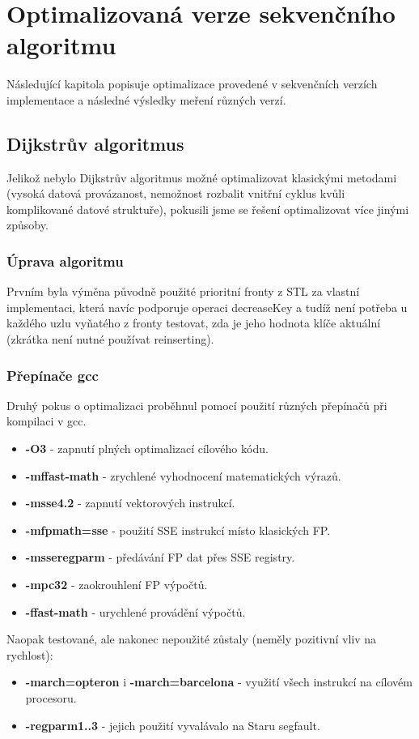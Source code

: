 \documentclass[a4paper,11pt]{article}
\begin{document}
\section{Optimalizovaná verze sekvenčního algoritmu}
Následující kapitola popisuje optimalizace provedené v sekvenčních verzích implementace a následné výsledky meření různých verzí.

\subsection{Dijkstrův algoritmus}
Jelikož nebylo Dijkstrův algoritmus možné optimalizovat klasickými metodami (vysoká datová provázanost, nemožnost rozbalit vnitřní cyklus kvůli komplikované datové struktuře), pokusili jsme se řešení optimalizovat více jinými způsoby. 
\par
\subsubsection{Úprava algoritmu}
Prvním byla výměna původně použité prioritní fronty z STL za vlastní implementaci, která navíc podporuje operaci decreaseKey a tudíž není po\-třeba u každého uzlu vyňatého z fronty testovat, zda je jeho hodnota klíče aktuální (zkrátka není nutné používat reinserting).
\subsubsection{Přepínače gcc}
Druhý pokus o optimalizaci proběhnul pomocí použití různých přepínačů při kompilaci v gcc.
\begin{itemize}
 \item \textbf{-O3} - zapnutí plných optimalizací cílového kódu.
 \item \textbf{-mffast-math} - zrychlené vyhodnocení matematických výrazů.
 \item \textbf{-msse4.2} - zapnutí vektorových instrukcí.
 \item \textbf{-mfpmath=sse} - použití SSE instrukcí místo klasických FP.
 \item \textbf{-msseregparm} - předávání FP dat přes SSE registry.
 \item \textbf{-mpc32} - zaokrouhlení FP výpočtů.
 \item \textbf{-ffast-math} - urychlené provádění výpočtů.
\end{itemize}
 Naopak testované, ale nakonec nepoužité zůstaly (neměly pozitivní vliv na rychlost): 
\begin{itemize}
 \item \textbf{-march=opteron} i \textbf{-march=barcelona}  - využití všech instrukcí na cílovém procesoru.
 \item \textbf{-regparm1..3} - jejich použití vyvalávalo na Staru segfault.
\end{itemize}
\end{document}
